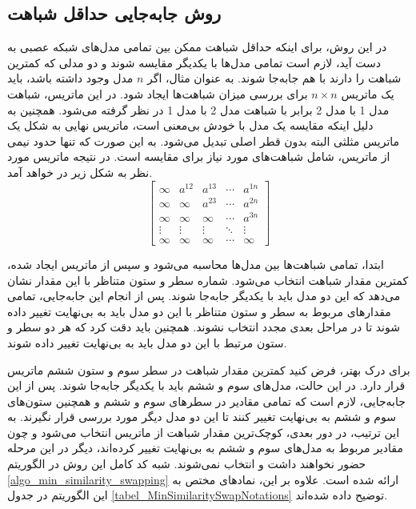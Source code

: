 \subsection{
	روش جابه‌جایی حداقل شباهت%
}
در این روش، برای اینکه حداقل شباهت ممکن بین تمامی مدل‌های شبکه عصبی به دست آید، لازم است تمامی مدل‌ها با یکدیگر مقایسه شوند و دو مدلی که کمترین شباهت را دارند با هم جابه‌جا شوند. به عنوان مثال، اگر \( n \) مدل وجود داشته باشد، باید یک ماتریس \( n \times n \) برای بررسی میزان شباهت‌ها ایجاد شود. در این ماتریس، شباهت مدل 1 با مدل 2 برابر با شباهت مدل 2 با مدل 1 در نظر گرفته می‌شود. همچنین به دلیل اینکه مقایسه یک مدل با خودش بی‌معنی است، ماتریس نهایی به شکل یک ماتریس مثلثی%
البته بدون قطر اصلی تبدیل می‌شود. به این صورت که تنها حدود نیمی از ماتریس، شامل شباهت‌های مورد نیاز برای مقایسه است. در نتیجه ماتریس مورد نظر به شکل زیر در خواهد آمد.
\begin{equation}
	\begin{bmatrix}
		\infty & a^{12} & a^{13} & \cdots & a^{1n} \\
		\infty & \infty & a^{23} & \cdots & a^{2n} \\
		\infty & \infty & \infty & \cdots & a^{3n} \\
		\vdots & \vdots & \vdots & \ddots & \vdots \\
		\infty & \infty & \infty & \cdots & \infty
	\end{bmatrix}
	\label{eq_similarity_matrix}
\end{equation}

ابتدا، تمامی شباهت‌ها بین مدل‌ها محاسبه می‌شود و سپس از ماتریس ایجاد شده، کمترین مقدار شباهت انتخاب می‌شود. شماره سطر و ستون متناظر با این مقدار نشان می‌دهد که این دو مدل باید با یکدیگر جابه‌جا شوند. پس از انجام این جابه‌جایی، تمامی مقدارهای مربوط به سطر و ستون متناظر با این دو مدل باید به بی‌نهایت تغییر داده شوند تا در مراحل بعدی مجدد انتخاب نشوند. همچنین باید دقت کرد که هر دو سطر و ستون مرتبط با این دو مدل باید به بی‌نهایت تغییر داده شوند.

برای درک بهتر، فرض کنید کمترین مقدار شباهت در سطر سوم و ستون ششم ماتریس قرار دارد. در این حالت، مدل‌های سوم و ششم باید با یکدیگر جابه‌جا شوند. پس از این جابه‌جایی، لازم است که تمامی مقادیر در سطرهای سوم و ششم و همچنین ستون‌های سوم و ششم به بی‌نهایت تغییر کنند تا این دو مدل دیگر مورد بررسی قرار نگیرند. به این ترتیب، در دور بعدی، کوچک‌ترین مقدار شباهت از ماتریس انتخاب می‌شود و چون مقادیر مربوط به مدل‌های سوم و ششم به بی‌نهایت تغییر کرده‌اند، دیگر در این مرحله حضور نخواهند داشت و انتخاب نمی‌شوند. شبه کد کامل این روش در الگوریتم
\ref{algo_min_similarity_swapping}
ارائه شده است. علاوه بر این، نمادهای مختص به این الگوریتم در جدول
\ref{tabel_MinSimilaritySwapNotations}
توضیح داده شده‌اند.


